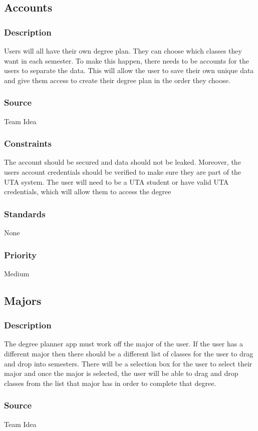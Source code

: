 \subsection{Accounts}
\subsubsection{Description}
Users will all have their own degree plan. They can choose which classes they want in each semester. To make this happen, there needs to be accounts for the users to separate the data. This will allow the user to save their own unique data and give them access to create their degree plan in the order they choose. 
\subsubsection{Source}
Team Idea
\subsubsection{Constraints}
The account should be secured and data should not be leaked. Moreover, the users account credentials should be verified to make sure they are part of the UTA system. The user will need to be a UTA student or have valid UTA credentials, which will allow them to access the degree 
\subsubsection{Standards}
None
\subsubsection{Priority}
Medium

\subsection{Majors}
\subsubsection{Description}
The degree planner app must work off the major of the user. If the user has a different major then there should be a different list of classes for the user to drag and drop into semesters. There will be a selection box for the user to select their major and once the major is selected, the user will be able to drag and drop classes from the list that major has in order to complete that degree.  
\subsubsection{Source}
Team Idea
